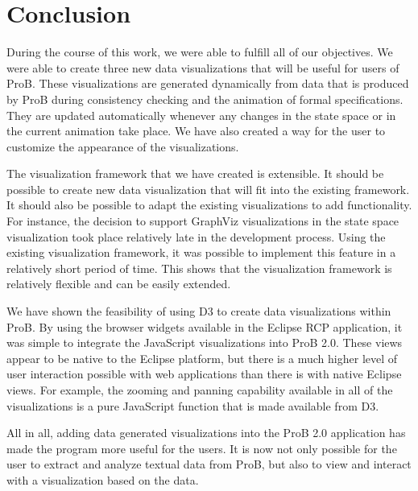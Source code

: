 \section{Conclusion}

During the course of this work, we were able to fulfill all of our objectives. We were able to create three new data visualizations that will be useful for users of ProB. These visualizations are generated dynamically from data that is produced by ProB during consistency checking and the animation of formal specifications. They are updated automatically whenever any changes in the state space or in the current animation take place. We have also created a way for the user to customize the appearance of the visualizations.

The visualization framework that we have created is extensible. It should be possible to create new data visualization that will fit into the existing framework. It should also be possible to adapt the existing visualizations to add functionality. For instance, the decision to support GraphViz visualizations in the state space visualization took place relatively late in the development process. Using the existing visualization framework, it was possible to implement this feature in a relatively short period of time. This shows that the visualization framework is relatively flexible and can be easily extended.

We have shown the feasibility of using D3 to create data visualizations within ProB. By using the browser widgets available in the Eclipse RCP application, it was simple to integrate the JavaScript visualizations into ProB 2.0. These views appear to be native to the Eclipse platform, but there is a much higher level of user interaction possible with web applications than there is with native Eclipse views. For example, the zooming and panning capability available in all of the visualizations is a pure JavaScript function that is made available from D3. 

All in all, adding data generated visualizations into the ProB 2.0 application has made the program more useful for the users. It is now not only possible for the user to extract and analyze textual data from ProB, but also to view and interact with a visualization based on the data.


